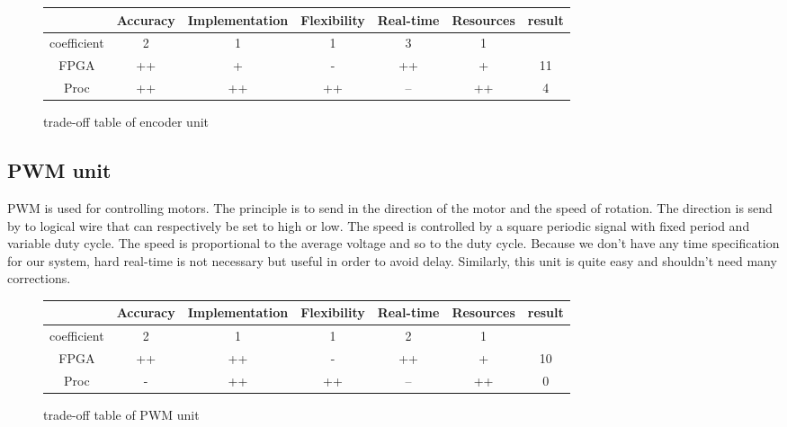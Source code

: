 \begin{figure}[!ht]
\hspace{-1cm}
\begin{tabular}{|c|c|c|c|c|c|c|}\hline
                         & Accuracy  & Implementation & Flexibility & Real-time & Resources & result \\\hline
coefficient   &         2          &           1                      &         1           &           3         &           1            &              \\\hline
FPGA            &      ++          &            +                    &         -           &        ++         &           +           &    11        \\\hline
Proc               &      ++         &              ++                &         ++       &         --          &           ++        &   4 \\\hline
\end{tabular}
\caption{trade-off table of encoder unit}
\end{figure}

\subsection{PWM unit}

PWM is used for controlling motors. The principle is to send in the direction of the motor and the speed of rotation. The direction is send by to logical wire that can respectively be set to high or low. The speed is controlled by a square periodic signal with fixed period and variable duty cycle. The speed is proportional to the average voltage and so to the duty cycle. Because we don't have any time specification for our system, hard real-time is not necessary but useful in order to avoid delay. Similarly, this unit is quite easy and shouldn't need many corrections. 

\begin{figure}[!ht]
\hspace{-1cm}
\begin{tabular}{|c|c|c|c|c|c|c|}\hline
                         & Accuracy  & Implementation & Flexibility & Real-time & Resources & result \\\hline
coefficient   &         2          &           1                      &         1           &           2         &         1               &             \\\hline
FPGA            &      ++          &            ++                 &         -           &        ++         &         +              &   10     \\\hline
Proc               &      -             &              ++               &         ++       &         --          &          ++          &       0    \\\hline
\end{tabular}
\caption{trade-off table of PWM unit}
\end{figure}

